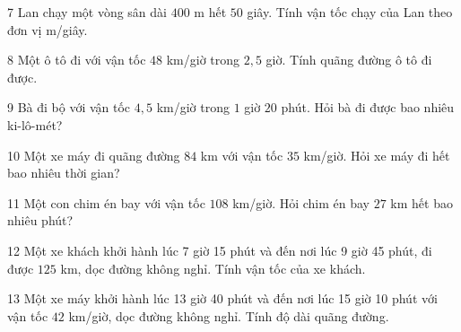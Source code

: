 \gap
\begin{probbox}{7}{\relax}
Lan chạy một vòng sân dài $400$ m hết $50$ giây. Tính vận tốc chạy của Lan theo đơn vị m/giây.
\end{probbox}
\gap
\begin{probbox}{8}{\relax}
Một ô tô đi với vận tốc $48$ km/giờ trong $2{,}5$ giờ. Tính quãng đường ô tô đi được.
\end{probbox}
\gap
\begin{probbox}{9}{\relax}
Bà đi bộ với vận tốc $4{,}5$ km/giờ trong $1$ giờ $20$ phút. Hỏi bà đi được bao nhiêu ki-lô-mét?
\end{probbox}
\gap
\begin{probbox}{10}{\relax}
Một xe máy đi quãng đường $84$ km với vận tốc $35$ km/giờ. Hỏi xe máy đi hết bao nhiêu thời gian?
\end{probbox}
\gap
\begin{probbox}{11}{\relax}
Một con chim én bay với vận tốc $108$ km/giờ. Hỏi chim én bay $27$ km hết bao nhiêu phút?
\end{probbox}
\gap
\begin{probbox}{12}{\relax}
Một xe khách khởi hành lúc 7 giờ 15 phút và đến nơi lúc 9 giờ 45 phút, đi được $125$ km, dọc đường không nghỉ. Tính vận tốc của xe khách.
\end{probbox}
\gap
\begin{probbox}{13}{\relax}
Một xe máy khởi hành lúc 13 giờ 40 phút và đến nơi lúc 15 giờ 10 phút với vận tốc $42$ km/giờ, dọc đường không nghỉ. Tính độ dài quãng đường.
\end{probbox}
